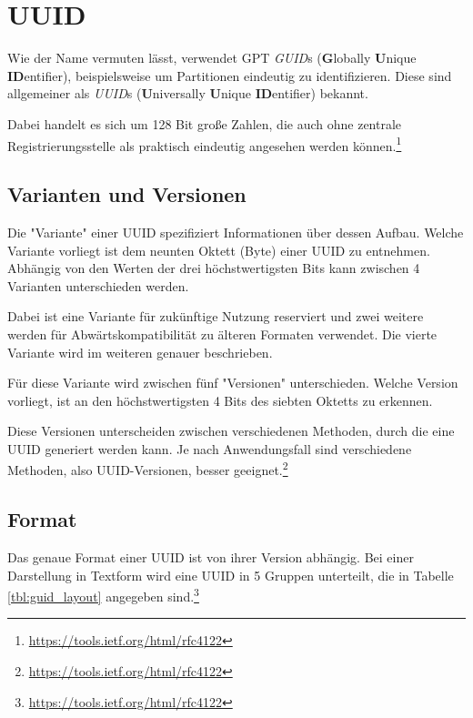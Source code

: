 \section{UUID}

Wie der Name vermuten lässt, verwendet GPT \textit{GUID}s (\textbf{G}lobally \textbf{U}nique \textbf{ID}entifier), beispielsweise um Partitionen eindeutig zu identifizieren.
Diese sind allgemeiner als \textit{UUID}s (\textbf{U}niversally \textbf{U}nique \textbf{ID}entifier) bekannt. 

Dabei handelt es sich um 128 Bit große Zahlen, die auch ohne zentrale Registrierungsstelle als praktisch eindeutig angesehen werden können.\footnote{\url{https://tools.ietf.org/html/rfc4122}}

\subsection{Varianten und Versionen}
\label{sec:guid:variants}

Die "Variante" einer UUID spezifiziert Informationen über dessen Aufbau.
Welche Variante vorliegt ist dem neunten Oktett (Byte) einer UUID zu entnehmen.
Abhängig von den Werten der drei höchstwertigsten Bits kann zwischen 4 Varianten unterschieden werden.

Dabei ist eine Variante für zukünftige Nutzung reserviert und zwei weitere werden für Abwärtskompatibilität zu älteren Formaten verwendet. 
Die vierte Variante wird im weiteren genauer beschrieben.

Für diese Variante wird zwischen fünf "Versionen" unterschieden.
Welche Version vorliegt, ist an den höchstwertigsten 4 Bits des siebten Oktetts zu erkennen.

Diese Versionen unterscheiden zwischen verschiedenen Methoden, durch die eine UUID generiert werden kann.
Je nach Anwendungsfall sind verschiedene Methoden, also UUID-Versionen, besser geeignet.\footnote{\url{https://tools.ietf.org/html/rfc4122}}


\subsection{Format}
\label{sec:guid:format}

Das genaue Format einer UUID ist von ihrer Version abhängig.
Bei einer Darstellung in Textform wird eine UUID in 5 Gruppen unterteilt, die in Tabelle \ref{tbl:guid_layout} angegeben sind.\footnote{\url{https://tools.ietf.org/html/rfc4122}}

